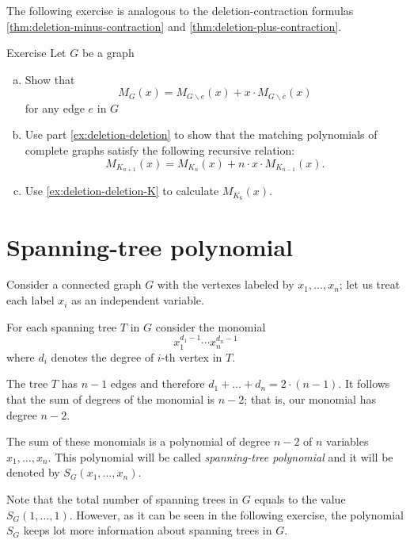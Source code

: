 The following exercise is analogous to the deletion-contraction formulas \ref{thm:deletion-minus-contraction} and \ref{thm:deletion-plus-contraction}.

\begin{thm}{Exercise}
Let $G$ be a graph
\begin{enumerate}[(a)]
\item\label{ex:deletion-deletion} Show that
\[M_G(x)=M_{G\backslash e}(x)+x\cdot M_{G\backslash \bar e}(x)\]
for any edge $e$ in $G$

\item\label{ex:deletion-deletion-K} Use part \ref{ex:deletion-deletion} to show that the matching polynomials of complete graphs satisfy the following recursive relation:
\[M_{K_{n+1}}(x)=M_{K_{n}}(x)+n\cdot x\cdot M_{K_{n-1}}(x).\]

\item Use \ref{ex:deletion-deletion-K} to calculate $M_{K_6}(x)$. 
\end{enumerate}

\end{thm}

\section*{Spanning-tree polynomial}

Consider a connected graph $G$ with the vertexes labeled by $x_1,\dots,x_n$;
let us treat each label $x_i$ as an independent variable.

For each spanning tree $T$ in $G$ consider the monomial 
\[x_1^{d_1-1}\cdots x_n^{d_n-1}\]
where $d_i$ denotes the degree of $i$-th vertex in $T$.

The tree $T$ has $n-1$ edges and therefore 
$d_1+\dots+d_n=2\cdot(n-1)$.
It follows that the sum of degrees of the monomial is $n-2$;
that is, our monomial has degree $n-2$.

The sum of these monomials is a polynomial of degree $n-2$ of $n$ variables $x_1,\dots, x_n$.
This polynomial will be called \emph{spanning-tree polynomial} and it will be denoted by 
$S_G(x_1,\dots,x_n)$.

Note that the total number of spanning trees in $G$ equals to the value
$S_G(1,\dots,1)$.
However, as it can be seen in the following exercise,
the polynomial $S_G$ keeps lot more information about spanning trees in $G$.

